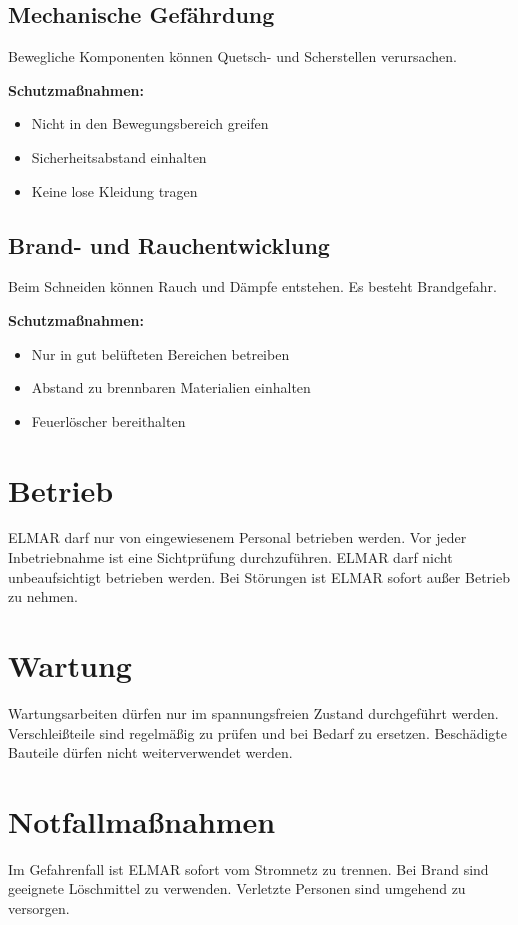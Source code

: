 \subsection{Mechanische Gefährdung}
Bewegliche Komponenten können Quetsch- und Scherstellen verursachen.

\textbf{Schutzmaßnahmen:}
\begin{itemize}
	\item Nicht in den Bewegungsbereich greifen
	\item Sicherheitsabstand einhalten
	\item Keine lose Kleidung tragen
\end{itemize}

\subsection{Brand- und Rauchentwicklung}
Beim Schneiden können Rauch und Dämpfe entstehen. Es besteht Brandgefahr.

\textbf{Schutzmaßnahmen:}
\begin{itemize}
	\item Nur in gut belüfteten Bereichen betreiben
	\item Abstand zu brennbaren Materialien einhalten
	\item Feuerlöscher bereithalten
\end{itemize}

\section{Betrieb}
ELMAR darf nur von eingewiesenem Personal betrieben werden. Vor jeder Inbetriebnahme ist eine Sichtprüfung durchzuführen. ELMAR darf nicht unbeaufsichtigt betrieben werden. Bei Störungen ist ELMAR sofort außer Betrieb zu nehmen.

\section{Wartung}
Wartungsarbeiten dürfen nur im spannungsfreien Zustand durchgeführt werden. Verschleißteile sind regelmäßig zu prüfen und bei Bedarf zu ersetzen. Beschädigte Bauteile dürfen nicht weiterverwendet werden.

\section{Notfallmaßnahmen}
Im Gefahrenfall ist ELMAR sofort vom Stromnetz zu trennen. Bei Brand sind geeignete Löschmittel zu verwenden. Verletzte Personen sind umgehend zu versorgen.



